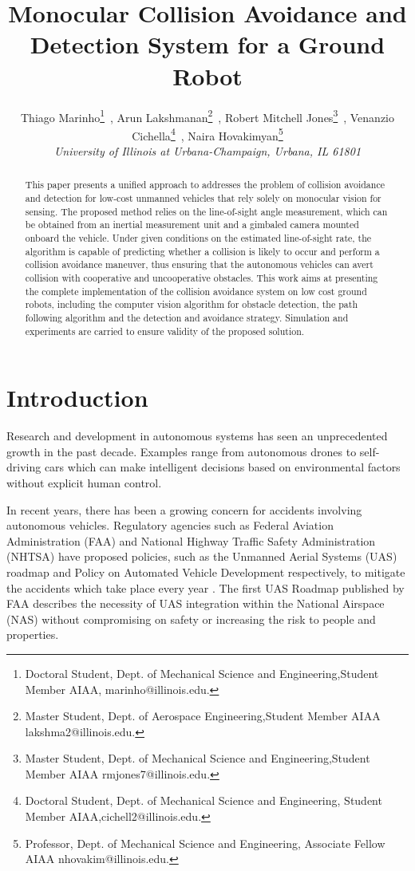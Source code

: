 \documentclass[]{aiaa-tc}%
\title{Monocular Collision Avoidance and Detection System for a Ground Robot}
\author{
   Thiago Marinho\thanks{Doctoral Student, Dept. of Mechanical Science and Engineering,Student Member AIAA, marinho@illinois.edu.}~,
   Arun Lakshmanan\thanks{Master Student, Dept. of Aerospace Engineering,Student Member AIAA lakshma2@illinois.edu.}~,
   Robert Mitchell Jones\thanks{Master Student,  Dept. of Mechanical Science and Engineering,Student Member AIAA rmjones7@illinois.edu.}~,
    Venanzio Cichella\thanks{Doctoral Student, Dept. of Mechanical Science and Engineering, Student Member AIAA,cichell2@illinois.edu.}~,
    Naira Hovakimyan\thanks{Professor, Dept. of Mechanical Science and Engineering, Associate Fellow AIAA
    nhovakim@illinois.edu.}\\
    {\normalsize\itshape University of Illinois at Urbana-Champaign, Urbana, IL 61801}
}
\begin{document}
\maketitle

\begin{abstract}

This paper presents a unified approach to addresses the problem of collision avoidance and detection for low-cost unmanned vehicles that rely solely on monocular vision for sensing. The proposed method relies on the line-of-sight angle measurement, which can be obtained from an inertial measurement unit and a gimbaled camera mounted onboard the vehicle. Under given conditions on the estimated line-of-sight rate, the algorithm is capable of predicting whether a collision is likely to occur and perform a collision avoidance maneuver, thus ensuring that the autonomous vehicles can avert collision with cooperative and uncooperative obstacles. This work aims at presenting the complete implementation of the collision avoidance system on low cost ground robots, including the computer vision algorithm for obstacle detection, the path following algorithm and the detection and avoidance strategy. Simulation and experiments are carried to ensure validity of the proposed solution.
\end{abstract}



\section{Introduction}
\label{sec:Introduction}
Research and development in autonomous systems  has seen an unprecedented growth in the past decade. Examples range from autonomous drones to self-driving cars which can make intelligent decisions based on environmental factors without explicit human control.

In recent years, there has been a growing concern for accidents involving autonomous vehicles. Regulatory agencies such as Federal Aviation Administration (FAA) and National Highway Traffic Safety Administration (NHTSA) have proposed policies, such as the Unmanned Aerial Systems (UAS) roadmap \cite{FAA_UAS} and Policy on Automated Vehicle Development \cite{autodev2014} respectively, to mitigate the accidents which take place every year \cite{FAAaccd2010}. The first UAS Roadmap published by FAA describes the necessity of UAS integration within the National Airspace (NAS) without compromising on safety or increasing the risk to people and properties.
\end{document}
